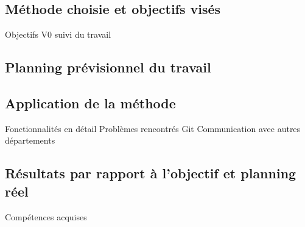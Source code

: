 \subsection{Méthode choisie et objectifs visés}
Objectifs V0
suivi du travail


\pagebreak
\subsection{Planning prévisionnel du travail}
\pagebreak
\subsection{Application de la méthode}

Fonctionnalités en détail
Problèmes rencontrés
Git
Communication avec autres départements

\pagebreak
\subsection{Résultats par rapport à l'objectif et planning réel}
Compétences acquises








